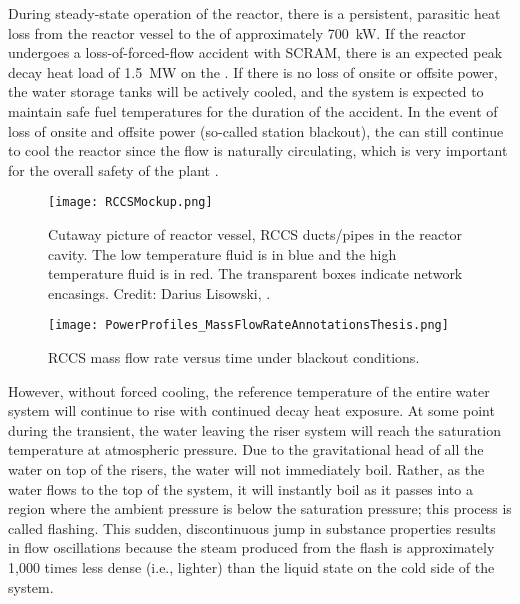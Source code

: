 During steady-state operation of the reactor, there is a persistent, parasitic heat loss from the reactor vessel to the  of approximately \SI{700}{\kilo\watt}.
If the reactor undergoes a loss-of-forced-flow accident with SCRAM, there is an expected peak decay heat load of \SI{1.5}{\mega\watt} on the .
If there is no loss of onsite or offsite power, the  water storage tanks will be actively cooled, and the system is expected to maintain safe fuel temperatures for the duration of the accident.
In the event of loss of onsite and offsite power (so-called station blackout), the  can still continue to cool the reactor since the flow is naturally circulating, which is very important for the overall safety of the plant \cite[]{nuclear_regulatory_comminission_u.s._2007}.

\begin{figure}%
\centering
    \caption[RCCS near-reactor-riser system]{   Cutaway picture of reactor vessel, RCCS ducts/pipes in the reactor cavity.  
                The low temperature fluid is in blue and the high temperature fluid is in red.  
                The transparent boxes indicate network encasings. 
                Credit: Darius Lisowski, \TheUniversity.}%
    \label{Figure:RCCSMockup}%
    \texttt{[image: RCCSMockup.png]}%
\end{figure}
\begin{figure}%
    \centering
    \caption[RCCS mass flow rate under blackout conditions]{RCCS mass flow rate versus time under blackout conditions.}%
    \label{Figure:RCCSFullScaleMassFlowRate}%
    \texttt{[image: PowerProfiles\_MassFlowRateAnnotationsThesis.png]}%
\end{figure}

However, without forced cooling, the reference temperature of the entire water system will continue to rise with continued decay heat exposure.
At some point during the transient, the water leaving the riser system will reach the saturation temperature at atmospheric pressure.  
Due to the gravitational head of all the water on top of the risers, the water will not immediately boil.
Rather, as the water flows to the top of the system, it will instantly boil as it passes into a region where the ambient pressure is below the saturation pressure; this process is called flashing.
This sudden, discontinuous jump in substance properties results in flow oscillations because the steam produced from the flash is approximately 1,000 times less dense (i.e., lighter) than the liquid state on the cold side of the system.

